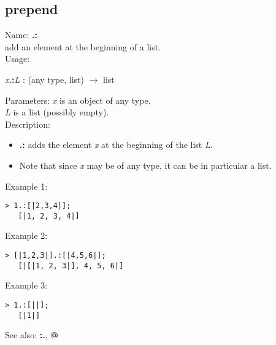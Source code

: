 \subsection{ prepend }
\noindent Name: \textbf{.:}\\
add an element at the beginning of a list.\\

\noindent Usage: 
\begin{center}
\emph{x}\textbf{.:}\emph{L} : (\textsf{any type}, \textsf{list}) $\rightarrow$ \textsf{list}\\
\end{center}
Parameters: 
\emph{x} is an object of any type.\\
\emph{L} is a list (possibly empty).\\

\noindent Description: \begin{itemize}

\item \textbf{.:} adds the element \emph{x} at the beginning of the list \emph{L}.

\item Note that since \emph{x} may be of any type, it can be in particular a list.
\end{itemize}
\noindent Example 1: 
\begin{center}\begin{minipage}{14.8cm}\begin{Verbatim}[frame=single]
   > 1.:[|2,3,4|];
   [|1, 2, 3, 4|]
\end{Verbatim}
\end{minipage}\end{center}
\noindent Example 2: 
\begin{center}\begin{minipage}{14.8cm}\begin{Verbatim}[frame=single]
   > [|1,2,3|].:[|4,5,6|];
   [|[|1, 2, 3|], 4, 5, 6|]
\end{Verbatim}
\end{minipage}\end{center}
\noindent Example 3: 
\begin{center}\begin{minipage}{14.8cm}\begin{Verbatim}[frame=single]
   > 1.:[||];
   [|1|]
\end{Verbatim}
\end{minipage}\end{center}
See also: \textbf{:.}, \textbf{@}
